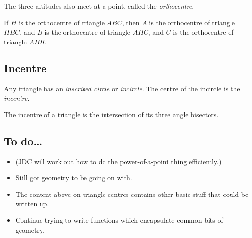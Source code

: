 \documentclass[a4paper, 14pt]{extarticle}
\begin{document}
\begin{center}
\end{center}

The three altitudes also meet at a point, called the \emph{orthocentre}.

If $H$ is the orthocentre of triangle $ABC$, then $A$ is the
orthocentre of triangle $HBC$, and $B$ is the orthocentre of triangle
$AHC$, and $C$ is the orthocentre of triangle $ABH$.

\subsection*{Incentre}

Any triangle has an \emph{inscribed circle} or \emph{incircle}. The
centre of the incircle is the \emph{incentre}.

The incentre of a triangle is the intersection of its three angle
bisectors.

\subsection*{To do\ldots}

\begin{itemize}
\item (JDC will work out how to do the power-of-a-point thing efficiently.)
\item Still got geometry to be going on with.
\item The content above on triangle centres contains other basic stuff
  that could be written up.
\item Continue trying to write functions which encapsulate common bits
  of geometry.
\end{itemize}
\end{document}
